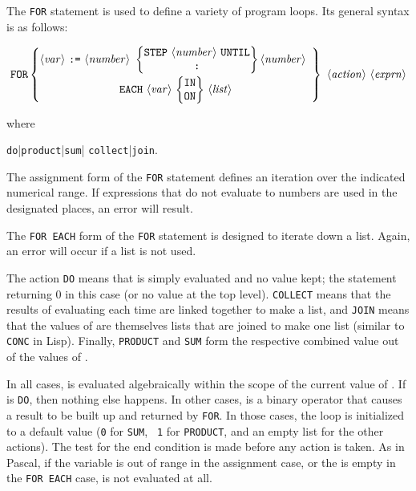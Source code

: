 The \texttt{FOR} statement is used to define a variety of program
loops.  Its general syntax is as follows:
\begin{small}
\[ \mbox{\texttt{FOR}} \left\{ \begin{array}{@{}ccc@{}}
    \mbox{\meta{var} \texttt{:=} \meta{number} } \left\{ \begin{array}{@{}c@{}}
    \mbox{\texttt{STEP} \meta{number} \texttt{UNTIL}} \\
    \mbox{\texttt{:}}
    \end{array}
    \right\} \mbox{\meta{number}} \\[3mm]
    \multicolumn{1}{c}{\mbox{\texttt{EACH} \meta{var}
       \(\left\{
          \begin{tabular}{@{}c@{}}
              \texttt{IN} \\ \texttt{ON}
          \end{tabular}
       \right\}\)
       \meta{list}}}
    \end{array}
    \right\} \mbox{ \meta{action} \meta{exprn}} \]
\end{small}%
%
where
\begin{syntax}
      \bnfprod \texttt{do}|\texttt{product}|\texttt{sum}|
                            \texttt{collect}|\texttt{join}.
\end{syntax}
The assignment form of the \texttt{FOR} statement defines an
iteration over the indicated numerical range.  If expressions that do not
evaluate to numbers are used in the designated places, an error will
result.

The \texttt{FOR EACH} form of the \texttt{FOR} statement is
designed to iterate down a list.  Again, an error will occur if a list is
not used.

The action \texttt{DO} means that  is simply
evaluated and no value kept; the statement returning 0 in this case (or no
value at the top level). \texttt{COLLECT} means that the results of
evaluating  each time are linked together to make a list,
and \texttt{JOIN} means that the values of  are themselves
lists that are joined to make one list (similar to \texttt{CONC} in Lisp).
Finally, \texttt{PRODUCT} and \texttt{SUM}
form the respective combined value out of the values of .

In all cases,  is evaluated algebraically within the
scope of the current value of .  If  is
\texttt{DO}, then nothing else happens.  In other cases, 
is a binary operator that causes a result to be built up and
returned by \texttt{FOR}.  In those cases, the loop is
initialized to a default value (\texttt{0} for \texttt{SUM}, {\tt
1} for \texttt{PRODUCT}, and an empty list for the other
actions).  The test for the end condition is made before any action is
taken.  As in Pascal, if the variable is out of range in the assignment
case, or the  is empty in the \texttt{FOR EACH}
case,  is not evaluated at all.

